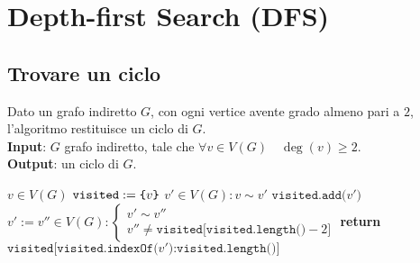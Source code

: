 \documentclass[14pt]{extreport}
\theoremstyle{definition}
\theoremstyle{definition}
\begin{document}
\section{Depth-first Search (DFS)}

\subsection{Trovare un ciclo}

\begin{algorithm}[H]
    \caption{
        Dato un grafo indiretto $G$, con ogni vertice avente grado almeno pari a $2$, l'algoritmo restituisce un ciclo di $G$.\\
        \textbf{Input}: $G$ grafo indiretto, tale che $\forall v \in V(G) \quad \deg(v) \ge 2$.\\
        \textbf{Output}: un ciclo di $G$.
    }

    \begin{algorithmic}[1]
            \State $v \in V(G)$ 
            \State $\texttt{visited} := \verb|{|v\verb|}|$ 
            \State $v' \in V(G) : v \sim v'$
             
                \State $\texttt{visited.add(}v'\texttt{)}$
                \State $v' := v'' \in V(G) : \left \{ \begin{array}{l}v' \sim v'' \\ v'' \neq \texttt{visited[visited.length()} - 2\texttt{]} \end{array} \right.$
            \EndWhile
            \State \textbf{return} $\texttt{visited[visited.indexOf(}v'\texttt{)} \texttt{:} \texttt{visited.length()]}$
        \EndFunction
    \end{algorithmic}
\end{algorithm}
\end{document}
